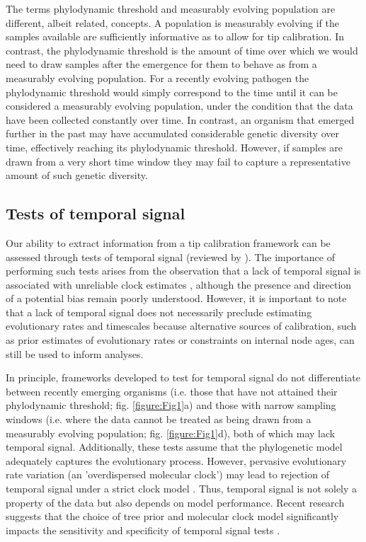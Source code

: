 \documentclass[11pt]{article}
\begin{document}
The terms phylodynamic threshold and measurably evolving population are different, albeit related, concepts. A population is measurably evolving if the samples available are sufficiently informative as to allow for tip calibration. In contrast, the phylodynamic threshold is the amount of time over which we would need to draw samples after the emergence for them to behave as from a measurably evolving population. For a recently evolving pathogen the phylodynamic threshold would simply correspond to the time until it can be considered a measurably evolving population, under the condition that the data have been collected constantly over time. In contrast, an organism that emerged further in the past may have accumulated considerable genetic diversity over time, effectively reaching its phylodynamic threshold. However, if samples are drawn from a very short time window they may fail to capture a representative amount of such genetic diversity. 

\subsection{Tests of temporal signal}
Our ability to extract information from a tip calibration framework can be assessed through tests of temporal signal (reviewed by \cite{rieux2016inferences}). The importance of performing such tests arises from the observation that a lack of temporal signal is associated with unreliable clock estimates \citep{duchene2015performance}, although the presence and direction of a potential bias remain poorly understood. However, it is important to note that a lack of temporal signal does not necessarily preclude estimating evolutionary rates and timescales because alternative sources of calibration, such as prior estimates of evolutionary rates or constraints on internal node ages, can still be used to inform analyses.

In principle, frameworks developed to test for temporal signal do not differentiate between recently emerging organisms (i.e. those that have not attained their phylodynamic threshold; fig. \ref{figure:Fig1}a) and those with narrow sampling windows (i.e. where the data cannot be treated as being drawn from a measurably evolving population; fig. \ref{figure:Fig1}d), both of which may lack temporal signal. Additionally, these tests assume that the phylogenetic model adequately captures the evolutionary process. However, pervasive evolutionary rate variation (an 'overdispersed molecular clock') may lead to rejection of temporal signal under a strict clock model \citep{tay2024assessing}. Thus, temporal signal is not solely a property of the data but also depends on model performance. Recent research suggests that the choice of tree prior and molecular clock model significantly impacts the sensitivity and specificity of temporal signal tests \citep{tay2024assessing}.
\end{document}
